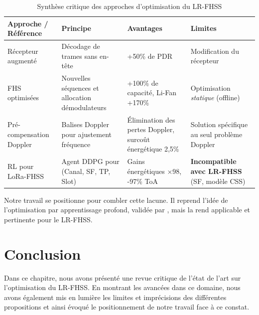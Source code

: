 \begin{table}[H]
	\centering
	\caption{Synthèse critique des approches d'optimisation du LR-FHSS}
	\label{tab:synthèse_etat_art}
	\begin{tabular}{|p{3cm}|p{4cm}|p{3cm}|p{4cm}|}
		\hline
		\textbf{Approche / Référence} & \textbf{Principe} & \textbf{Avantages} & \textbf{Limites} \\
		\hline
		Récepteur augmenté \cite{maldonado2025headerless} & Décodage de trames sans en-tête & +50\% de PDR & Modification du récepteur \\
		\hline
		FHS optimisées \cite{maldonado2025enhancing} & Nouvelles séquences et allocation démodulateurs & +100\% de capacité, Li-Fan +170\% & Optimisation \textit{statique} (offline) \\
		\hline
		Pré-compensation Doppler \cite{ullah_extending_doppler_2025} & Balises Doppler pour ajustement fréquence & Élimination des pertes Doppler, surcoût énergétique 2,5\% & Solution spécifique au seul problème Doppler \\
		\hline
		RL pour LoRa-FHSS \cite{greenlora,greenlora2024} & Agent DDPG pour (Canal, SF, TP, Slot) & Gains énergétiques ×98, -97\% ToA & \textbf{Incompatible avec LR-FHSS} (SF, modèle CSS) \\
		\hline
	\end{tabular}
\end{table}

Notre travail se positionne pour combler cette lacune. Il reprend l'idée de l'optimisation par apprentissage profond, validée par \cite{greenlora,greenlora2024}, mais la rend applicable et pertinente pour le LR-FHSS.

\section{Conclusion}
Dans ce chapitre, nous avons présenté une revue critique de l'état de l'art sur l'optimisation du LR-FHSS. En montrant les avancées dans ce domaine, nous avons également mis en lumière les limites et imprécisions des différentes propositions et ainsi évoqué le positionnement de notre travail face à ce constat.